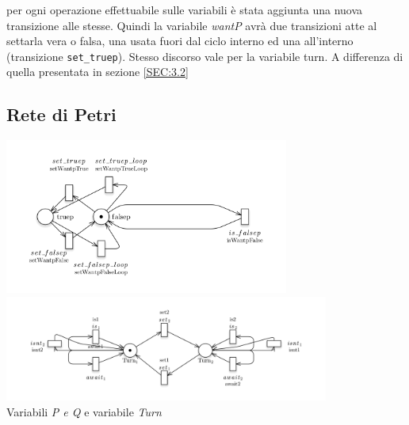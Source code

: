 \documentclass[a4paper]{article}
\begin{document}
per ogni operazione effettuabile sulle variabili è stata aggiunta una nuova transizione alle stesse.
Quindi la variabile \textit{wantP} avrà due transizioni atte al settarla vera o falsa, una usata fuori dal ciclo interno ed una all'interno (transizione \texttt{set\_truep}).
Stesso discorso vale per la variabile turn. A differenza di quella presentata in sezione \ref{SEC:3.2}
\subsection{Rete di Petri}
\begin{center}
\includegraphics[width=0.7\textwidth]{WantP.png}
\includegraphics[width=0.8\textwidth]{turn.png}\\
Variabili \textit{P \textit{e} Q} e variabile \textit{Turn}
\end{center}
\end{document}
